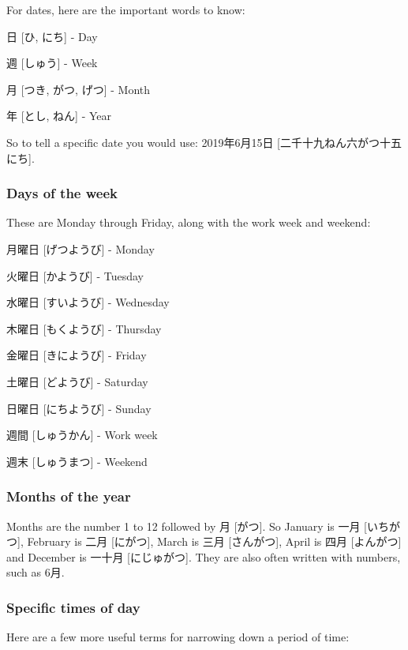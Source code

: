 \documentclass{article}
\begin{document}
\begin{CJK}{UTF8}{min}
\begin{multicols*}{3}
For dates, here are the important words to know:

\begin{colorize}
\item 日 [ひ, にち] - Day
\item 週 [しゅう] - Week
\item 月 [つき, がつ, げつ] - Month
\item 年 [とし, ねん] - Year
\end{colorize}

So to tell a specific date you would use: 2019年6月15日 [二千十九ねん六がつ十五にち].

\subsubsection{Days of the week}

These are Monday through Friday, along with the work week and weekend:

\begin{colorize}
\item 月曜日 [げつようび] - Monday
\item 火曜日 [かようび] - Tuesday
\item 水曜日 [すいようび] - Wednesday
\item 木曜日 [もくようび] - Thursday
\item 金曜日 [きにようび] - Friday
\item 土曜日 [どようび] - Saturday
\item 日曜日 [にちようび] - Sunday
\item 週間 [しゅうかん] - Work week
\item 週末 [しゅうまつ] - Weekend
\end{colorize}

\subsubsection{Months of the year}

Months are the number 1 to 12 followed by 月 [がつ]. So January is 一月 [いちがつ], February is 二月 [にがつ], March is 三月 [さんがつ], April is 四月 [よんがつ] and December is 
一十月 [にじゅがつ]. They are also often written with numbers, such as 6月.

\subsubsection{Specific times of day}

Here are a few more useful terms for narrowing down a period of time:


\end{multicols*}
\end{CJK}
\end{document}
